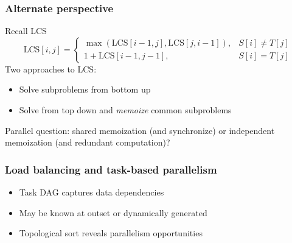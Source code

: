 \documentclass{beamer}
\begin{document}
\begin{frame}
  \frametitle{Alternate perspective}

  Recall LCS
  \[
  \mathrm{LCS}[i,j] =
  \begin{cases}
    \max(\mathrm{LCS}[i-1,j], \mathrm{LCS}[j,i-1]), & S[i] \neq T[j] \\
    1 + \mathrm{LCS}[i-1,j-1], & S[i] = T[j]
  \end{cases}
  \]
  Two approaches to LCS:
  \begin{itemize}
  \item Solve subproblems from bottom up
  \item Solve from top down and {\em memoize} common subproblems
  \end{itemize}
  Parallel question: shared memoization (and synchronize) or
  independent memoization (and redundant computation)?
\end{frame}


\begin{frame}
  \frametitle{Load balancing and task-based parallelism}

  \begin{center}

    \begin{itemize}
    \item Task DAG captures data dependencies
    \item May be known at outset or dynamically generated
    \item Topological sort reveals parallelism opportunities
    \end{itemize}
  \end{center}
\end{frame}
\end{document}

